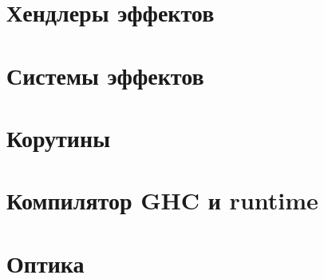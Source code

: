 \documentclass[12pt]{article}
\begin{document}







    \section{Хендлеры эффектов} \label{sec:effect-handlers}




    \section{Системы эффектов}



    \section{Корутины}



    \section{Компилятор GHC и runtime}



    \section{Оптика}











    \newpage
    
\end{document}
